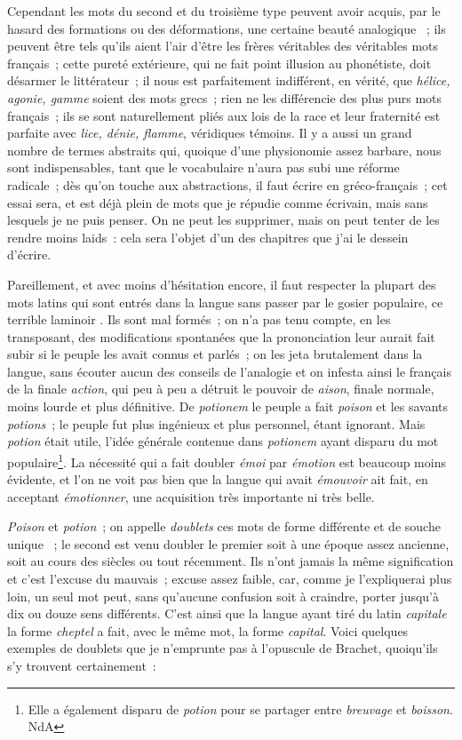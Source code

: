 \documentclass[french,twoside]{book} %
\begin{document}
Cependant les mots du second et du troisième type peuvent avoir acquis, par le hasard des formations ou des déformations, une certaine beauté analogique  ; ils peuvent être tels qu’ils aient l’air d’être les frères véritables des véritables mots français ; cette pureté extérieure, qui ne fait point illusion au phonétiste, doit désarmer le littérateur ; il nous est parfaitement indifférent, en vérité, que {\itshape hélice, agonie, gamme} soient des mots grecs ; rien ne les différencie des plus purs mots français ; ils se sont naturellement pliés aux lois de la race et leur fraternité est parfaite avec {\itshape lice, dénie, flamme}, véridiques témoins. Il y a aussi un grand nombre de termes abstraits qui, quoique d’une physionomie assez barbare, nous sont indispensables, tant que le vocabulaire n’aura pas subi une réforme radicale ; dès qu’on touche aux abstractions, il faut écrire en gréco-français ; cet essai sera, et est déjà plein de mots que je répudie comme écrivain, mais sans lesquels je ne puis penser. On ne peut les supprimer, mais on peut tenter de les rendre moins laids : cela sera l’objet d’un des chapitres que j’ai le dessein d’écrire.\par
Pareillement, et avec moins d’hésitation encore, il faut respecter la plupart des mots latins qui sont entrés dans la langue sans passer par le gosier populaire, ce terrible laminoir . Ils sont mal formés ; on n’a pas tenu compte, en les transposant, des modifications spontanées que la prononciation leur aurait fait subir si le peuple les avait connus et parlés ; on les jeta brutalement dans la langue, sans écouter aucun des conseils de l’analogie et on infesta ainsi le français de la finale {\itshape action}, qui peu à peu a détruit le pouvoir de {\itshape aison}, finale normale, moins lourde et plus définitive. De {\itshape potionem} le peuple a fait {\itshape poison} et les savants {\itshape potions} ; le peuple fut plus ingénieux et plus personnel, étant ignorant. Mais {\itshape potion} était utile, l’idée générale contenue dans {\itshape potionem} ayant disparu du mot populaire\footnote{Elle a également disparu de {\itshape potion} pour se partager entre {\itshape breuvage} et {\itshape boisson}. NdA}. La nécessité qui a fait doubler {\itshape émoi} par {\itshape émotion} est beaucoup moins évidente, et l’on ne voit pas bien que la langue qui avait {\itshape émouvoir} ait fait, en acceptant {\itshape émotionner}, une acquisition très importante ni très belle.\par
{\itshape Poison} et {\itshape potion} ; on appelle {\itshape doublets} ces mots de forme différente et de souche unique  ; le second est venu doubler le premier soit à une époque assez ancienne, soit au cours des siècles ou tout récemment. Ils n’ont jamais la même signification et c’est l’excuse du mauvais ; excuse assez faible, car, comme je l’expliquerai plus loin, un seul mot peut, sans qu’aucune confusion soit à craindre, porter jusqu’à dix ou douze sens différents. C’est ainsi que la langue ayant tiré du latin {\itshape capitale} la forme {\itshape cheptel} a fait, avec le même mot, la forme {\itshape capital}. Voici quelques exemples de doublets que je n’emprunte pas à l’opuscule de Brachet, quoiqu’ils s’y trouvent certainement :\par
\end{document}
